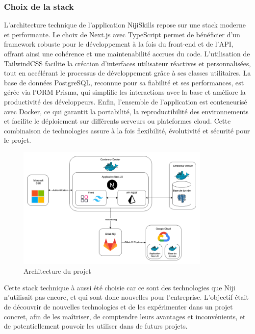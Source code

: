 \documentclass[12pt]{article}
\begin{document}
\subsubsection{Choix de la stack}

L’architecture technique de l’application NijiSkills repose sur une stack moderne et performante. Le choix de Next.js avec TypeScript permet de bénéficier d’un framework robuste pour le développement à la fois du front-end et de l’API, offrant ainsi une cohérence et une maintenabilité accrues du code. L’utilisation de TailwindCSS facilite la création d’interfaces utilisateur réactives et personnalisées, tout en accélérant le processus de développement grâce à ses classes utilitaires. La base de données PostgreSQL, reconnue pour sa fiabilité et ses performances, est gérée via l’ORM Prisma, qui simplifie les interactions avec la base et améliore la productivité des développeurs. Enfin, l’ensemble de l’application est conteneurisé avec Docker, ce qui garantit la portabilité, la reproductibilité des environnements et facilite le déploiement sur différents serveurs ou plateformes cloud. Cette combinaison de technologies assure à la fois flexibilité, évolutivité et sécurité pour le projet.
\begin{figure}[H]
  \centering
  \includegraphics[width=0.85\textwidth]{img/archi.png}
  \caption{Architecture du projet}
\end{figure}
\noindent
Cette stack technique à aussi été choisie car ce sont des technologies que Niji n'utilisait pas encore, et qui sont donc nouvelles pour l'entreprise. L'objectif était de découvrir de nouvelles technologies et de les expérimenter dans un projet concret, afin de les maîtriser, de comptendre leurs avantages et inconvénients, et de potentiellement pouvoir les utiliser dans de futurs projets.
\newpage
\end{document}
